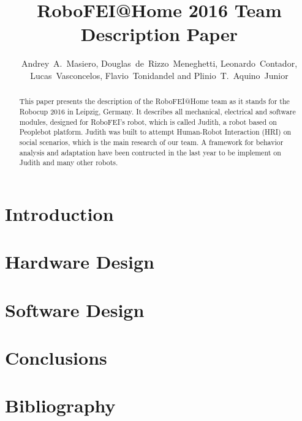 \documentclass[runningheads,a4paper]{llncs}
\begin{document}
\title{RoboFEI@Home 2016 Team Description Paper}
\author{Andrey~A.~Masiero, Douglas~de~Rizzo~Meneghetti, Leonardo~Contador, Lucas~Vasconcelos, Flavio~Tonidandel and Plinio~T.~Aquino~Junior}

\maketitle



\begin{abstract}
This paper presents the description of the RoboFEI@Home team as it stands for the Robocup 2016 in Leipzig, Germany. It describes all mechanical, electrical and software modules, designed for RoboFEI's robot, which is called Judith, a robot based on Peoplebot platform. Judith was built to attempt Human-Robot Interaction (HRI) on social scenarios, which is the main research of our team. A framework for behavior analysis and adaptation have been contructed in the last year to be implement on Judith and many other robots.
\end{abstract}


\section{Introduction}


\section{Hardware Design}


\section{Software Design}
%

\section{Conclusions}
%

\section{Bibliography}


\end{document}

